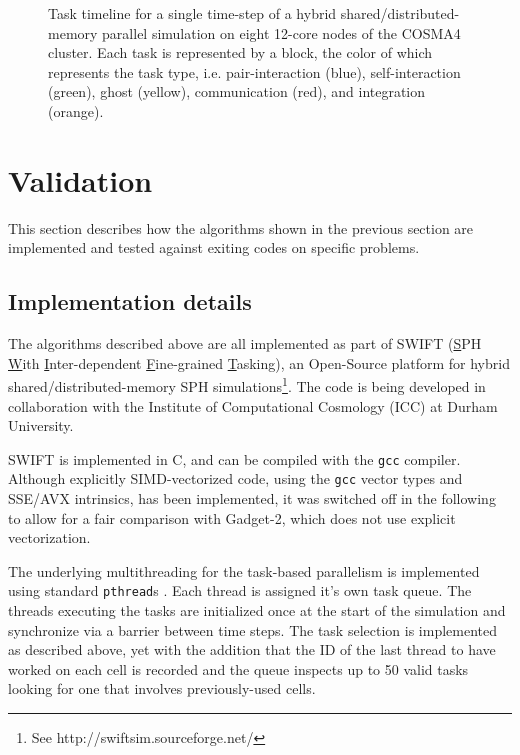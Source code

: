 \documentclass[final]{siamltex}
\begin{document}
\begin{figure}
    \centerline{}
    \caption{Task timeline for a single time-step of a hybrid
        shared/distributed-memory parallel simulation on
        eight 12-core nodes of the COSMA4 cluster.
        Each task is represented by a block, the color of which represents
        the task type, i.e. pair-interaction (blue), self-interaction (green),
        ghost (yellow), communication (red), and integration (orange).}
    \label{fig:TaskPlot}
\end{figure}


\section{Validation}

This section describes how the algorithms shown in the previous section
are implemented and tested against exiting codes on specific problems.

\subsection{Implementation details}

The algorithms described above are all implemented as part
of SWIFT (\underline{S}PH \underline{W}ith
\underline{I}nter-dependent \underline{F}ine-grained
\underline{T}asking),
an Open-Source platform for hybrid shared/distributed-memory
SPH simulations\footnote{See http://swiftsim.sourceforge.net/}.
The code is being developed in collaboration with the Institute
of Computational Cosmology (ICC) at Durham University.

SWIFT is implemented in C, and can be compiled with the
{\tt gcc} compiler.
Although explicitly SIMD-vectorized code, using the {\tt gcc} vector types
and SSE/AVX intrinsics, has been implemented, it was switched
off in the following to allow for a fair comparison with
Gadget-2, which does not use explicit vectorization.

The underlying multithreading for the task-based parallelism is
implemented using standard {\tt pthread}s \cite{ref:pthreads}.
Each thread is assigned it's own task queue.
The threads executing the tasks are initialized once at the
start of the simulation
and synchronize via a barrier between time steps.
The task selection is implemented as described above, yet with the
addition that the ID of the last thread to have worked on each
cell is recorded and the queue inspects up to 50 valid tasks 
looking for one that involves previously-used cells.
\end{document}

